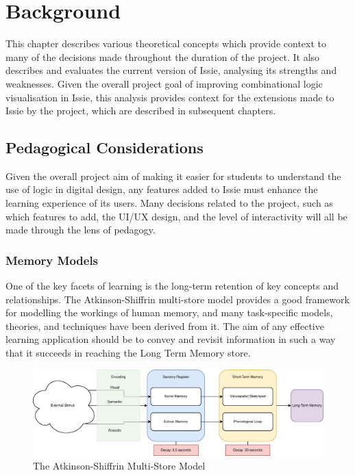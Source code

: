 \chapter{Background} \label{chap:background}
This chapter describes various theoretical concepts which provide context to many of the decisions made throughout the duration of the project. It also describes and evaluates the current version of Issie, analysing its strengths and weaknesses. Given the overall project goal of improving combinational logic visualisation in Issie, this analysis provides context for the extensions made to Issie by the project, which are described in subsequent chapters.
\section{Pedagogical Considerations} \label{sec:ped_cons}
Given the overall project aim of making it easier for students to understand the use of logic in digital design, any features added to Issie must enhance the learning experience of its users. Many decisions related to the project, such as which features to add, the UI/UX design, and the level of interactivity will all be made through the lens of pedagogy.
\subsection{Memory Models} \label{subsec:memmodels}
One of the key facets of learning is the long-term retention of key concepts and relationships. The Atkinson-Shiffrin multi-store model \cite{memory_model} provides a good framework for modelling the workings of human memory, and many task-specific models, theories, and techniques have been derived from it. The aim of any effective learning application should be to convey and revisit information in such a way that it succeeds in reaching the Long Term Memory store.

\begin{figure} [h]
    \centering
    \includegraphics[width=\textwidth]{02.Background/atkinson.eps}
    \caption{The Atkinson-Shiffrin Multi-Store Model}
    \label{fig:atkinson}
\end{figure}

